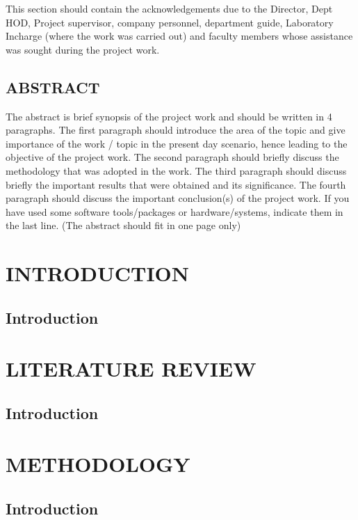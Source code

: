 \documentclass[a4paper,12pt]{report}
\begin{document}
This section should contain the acknowledgements due to the Director, Dept HOD, Project supervisor, company personnel, department guide, Laboratory Incharge (where the work was carried out) and faculty members whose assistance was sought during the project work.
\clearpage
\newpage
\begin{center} \section*{\textbf{\Large ABSTRACT}} \end{center}
The abstract is brief synopsis of the project work and should be written in 4 paragraphs. The
first paragraph should introduce the area of the topic and give importance of the work / topic
in the present day scenario, hence leading to the objective of the project work. The second
paragraph should briefly discuss the methodology that was adopted in the work. The third
paragraph should discuss briefly the important results that were obtained and its significance.
The fourth paragraph should discuss the important conclusion(s) of the project work. If you
have used some software tools/packages or hardware/systems, indicate them in the last line.
(The abstract should fit in one page only)
\newpage
\tableofcontents
\thispagestyle{empty}
\newpage
\listoftables
{}
\thispagestyle{empty}
\newpage
\listoffigures
{}
\thispagestyle{empty}
\newpage
{}
\chapter{\textbf{\Large INTRODUCTION}}
\section{\textbf{ Introduction }}
\newpage
\chapter{\textbf{\Large LITERATURE REVIEW}}
\section{\textbf{ Introduction }}
\newpage
\chapter{\textbf{\Large METHODOLOGY}}
\section{\textbf{ Introduction }}
\newpage
\end{document}
